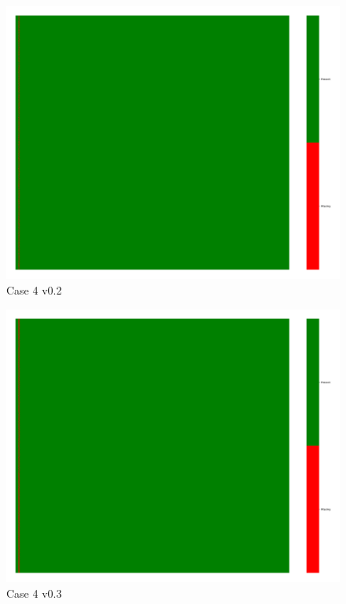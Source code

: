 \documentclass[a4paper,12pt]{article}
\begin{document}
\begin{figure}[H]
    \includegraphics[width=\linewidth]{case4_v0.2_heatmap_cleaned.png}
    \caption*{Case 4 v0.2}
\end{figure}

\begin{figure}[H]
    \includegraphics[width=\linewidth]{case4_v0.3_heatmap_cleaned.png}
    \caption*{Case 4 v0.3}
\end{figure}
\end{document}
